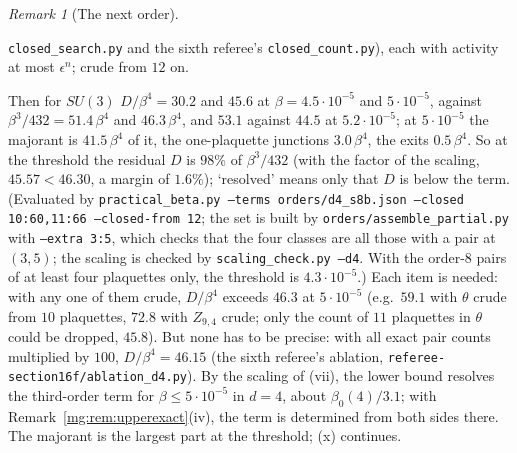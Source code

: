 \documentclass[11pt,a4paper]{article}
\theoremstyle{definition}
\theoremstyle{remark}
\newtheorem{remark}[theorem]{Remark}
\begin{document}
\begin{remark}[The next order]
\begin{itemize}
\texttt{closed\_search.py} and the sixth referee's \texttt{closed\_count.py}), each with activity at most $\epsilon^n$; crude from $12$ on.
\end{itemize}
Then for $SU(3)$ $D/\beta^4=30.2$ and $45.6$ at $\beta=4.5\cdot10^{-5}$ and $5\cdot10^{-5}$, against $\beta^3/432=51.4\,\beta^4$ and $46.3\,\beta^4$, and $53.1$ against $44.5$ at $5.2\cdot10^{-5}$;
at $5\cdot10^{-5}$ the majorant is $41.5\,\beta^4$ of it, the one-plaquette junctions $3.0\,\beta^4$, the exits $0.5\,\beta^4$. So at the threshold the residual $D$ is $98\%$ of
$\beta^3/432$ (with the factor of the scaling, $45.57<46.30$, a margin of $1.6\%$); `resolved' means only that $D$ is below the term. (Evaluated by
\texttt{practical\_beta.py --terms orders/d4\_s8b.json --closed 10:60,11:66 --closed-from 12}; the set is built by \texttt{orders/assemble\_partial.py} with
\texttt{--extra 3:5}, which checks that the four classes are all those with a pair at $(3,5)$; the scaling is checked by \texttt{scaling\_check.py --d4}. With the order-8 pairs of at
least four plaquettes only, the threshold is $4.3\cdot10^{-5}$.) Each item is needed: with any one of them crude, $D/\beta^4$ exceeds $46.3$ at $5\cdot10^{-5}$ (e.g.\
$59.1$ with $\theta$ crude from $10$ plaquettes, $72.8$ with $Z_{9,4}$ crude; only the count of $11$ plaquettes in $\theta$ could be dropped, $45.8$). But none has to be precise: with all
exact pair counts multiplied by $100$, $D/\beta^4=46.15$ (the sixth referee's ablation, \texttt{referee-section16f/ablation\_d4.py}).
By the scaling of (vii), the lower bound resolves the third-order term for $\beta\le5\cdot10^{-5}$ in $d=4$, about $\beta_0(4)/3.1$; with Remark~\ref{mg:rem:upperexact}(iv), the term is
determined from both sides there. The majorant is the largest part at the threshold; (x) continues.


\end{remark}
\end{document}
